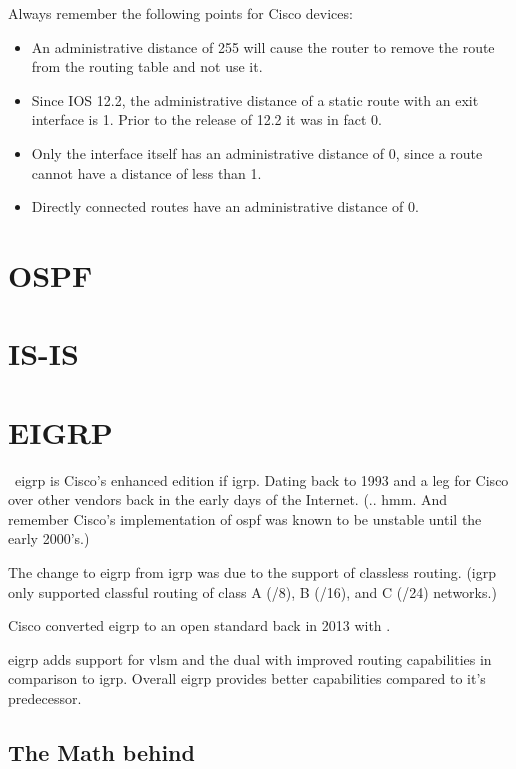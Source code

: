 Always remember the following points for Cisco devices:\cite{wiki:Administrative_distance}
\begin{itemize}
    \item An administrative distance of 255 will cause the router to remove the route from the routing table and not use it.
    \item Since IOS 12.2, the administrative distance of a static route with an exit interface is 1. Prior to the release of 12.2 it was in fact 0.
    \item Only the interface itself has an administrative distance of 0, since a route cannot have a distance of less than 1.
    \item Directly connected routes have an administrative distance of 0.
\end{itemize}

\newpage

\section{OSPF}

\newpage

\section{IS-IS}

\newpage

\section{EIGRP}
\
\gls{eigrp} is Cisco's enhanced edition if \gls{igrp}. Dating back to 1993 and a leg for Cisco over other vendors back in the early days of the Internet. (.. hmm. And remember Cisco's implementation of \gls{ospf} was known to be unstable until the early 2000's.)

The change to \gls{eigrp} from \gls{igrp} was due to the support of classless routing. (\gls{igrp} only supported classful routing of class A (/8), B (/16), and C (/24) networks.)

Cisco converted \gls{eigrp} to an open standard back in 2013 with .\cite{wiki:Enhanced_Interior_Gateway_Routing_Protocol}

\gls{eigrp} adds support for \gls{vlsm} and the \gls{dual} with improved routing capabilities in comparison to \gls{igrp}. Overall \gls{eigrp} provides better capabilities compared to it's predecessor.

\subsection[Math]{The Math behind}

